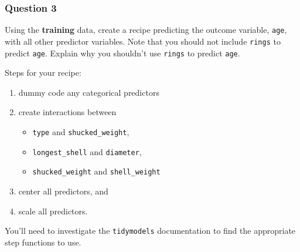 \documentclass[
]{article}
\providecommand{\tightlist}{%
  \setlength{\itemsep}{0pt}\setlength{\parskip}{0pt}}
\begin{document}
\hypertarget{question-3}{%
\subsubsection{Question 3}\label{question-3}}

Using the \textbf{training} data, create a recipe predicting the outcome
variable, \texttt{age}, with all other predictor variables. Note that
you should not include \texttt{rings} to predict \texttt{age}. Explain
why you shouldn't use \texttt{rings} to predict \texttt{age}.

Steps for your recipe:

\begin{enumerate}
\def\labelenumi{\arabic{enumi}.}
\item
  dummy code any categorical predictors
\item
  create interactions between

  \begin{itemize}
  \tightlist
  \item
    \texttt{type} and \texttt{shucked\_weight},
  \item
    \texttt{longest\_shell} and \texttt{diameter},
  \item
    \texttt{shucked\_weight} and \texttt{shell\_weight}
  \end{itemize}
\item
  center all predictors, and
\item
  scale all predictors.
\end{enumerate}

You'll need to investigate the \texttt{tidymodels} documentation to find
the appropriate step functions to use.
\end{document}
